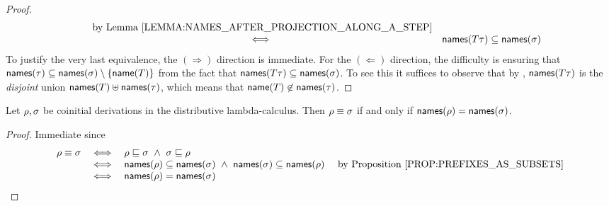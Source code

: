 \begin{proof}
\[\begin{array}{rcll}
      & \text{ by \rlem{names_after_projection_along_a_step}} \\
    & \iff &
    \names(\redexthree\redseqthree) \subseteq \names(\redseqtwo)
  \end{array}
\]
To justify the very last equivalence, the $(\Rightarrow)$ direction is immediate.
For the $(\Leftarrow)$ direction,
the difficulty is ensuring that
$\mathsf{names}(\tau) \subseteq \mathsf{names}(\sigma) \setminus \{\mathsf{name}(T)\}$
from the fact that
$\mathsf{names}(T\tau) \subseteq \mathsf{names}(\sigma)$.
To see this it suffices to observe that by ,
$\mathsf{names}(T\tau)$
is the {\em disjoint} union
$\mathsf{names}(T) \uplus \mathsf{names}(\tau)$,
which means that
$\mathsf{name}(T) \not\in \mathsf{names}(\tau)$.

\end{proof}

\begin{corollary}
Let $\rho,\sigma$ be coinitial derivations in the distributive lambda-calculus.
Then
$\rho \equiv \sigma$ if and only if $\mathsf{names}(\rho) = \mathsf{names}(\sigma)$.
\end{corollary}
\begin{proof}
Immediate since
\[
  \begin{array}{rcll}
  \redseq \permeq \redseqtwo & \iff & \redseq \permle \redseqtwo \ \land\ \redseqtwo \permle \redseq \\
                             & \iff & \names(\redseq) \subseteq \names(\redseqtwo) \ \land\ \names(\redseqtwo) \subseteq \names(\redseq)
                                    & \text{ by \rprop{prefixes_as_subsets}}\\
                             & \iff & \names(\redseq) = \names(\redseqtwo)
  \end{array}
\]
\end{proof}
